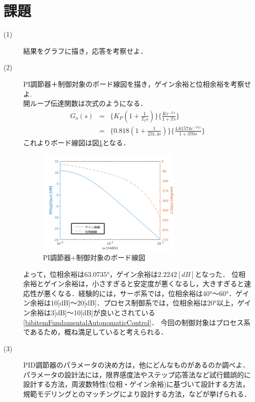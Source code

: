 \documentclass[12pt]{jsarticle}
\begin{document}
\section{課題}
\begin{description}
\item[(1)]結果をグラフに描き，応答を考察せよ．\\ %
\item[(2)]PI調節器＋制御対象のボード線図を描き，ゲイン余裕と位相余裕を考察せよ.\\
開ループ伝達関数は次式のようになる．
\begin{eqnarray}
  \label{PID_openG}
  G_o(s) &=& \{K_P(1+\frac{1}{T_Is})\}\{\frac{Ke^{-Ls}}{1+Ts}\} \\
  &=& \{0.818(1+\frac{1}{231.4s})\}\{\frac{4.61574e^{-75s}}{1+370s}\}
\end{eqnarray}
これよりボード線図は図\ref{BodeChart_PID}となる．
\begin{figure}[tb]
  \begin{center}
    \includegraphics[clip,width=7.0cm]{../graph/BodeChart_PID.png}
    \caption{PI調節器+制御対象のボード線図}
    \label{BodeChart_PID}
  \end{center}
\end{figure}
よって，位相余裕は$63.0735°$，ゲイン余裕は$2.2242[dB]$となった．
位相余裕とゲイン余裕は，小さすぎると安定度が悪くなるし，大きすぎると速応性が悪くなる．経験的には，サーボ系では，位相余裕は40°〜60°．ゲイン余裕は10[dB]〜20[dB]．プロセス制御系では，位相余裕は20°以上，ゲイン余裕は3[dB]〜10[dB]が良いとされている\ref{bibitemFundamentalAutonomaticControl}．
今回の制御対象はプロセス系であるため，概ね満足していると考えられる．
\item[(3)]PID調節器のパラメータの決め方は，他にどんなものがあるのか調べよ．\\
パラメータの設計法には，限界感度法やステップ応答法など試行錯誤的に設計する方法，周波数特性(位相・ゲイン余裕)に基づいて設計する方法，規範モデリングとのマッチングにより設計する方法，などが挙げられる．\\

\end{description}
\end{document}
